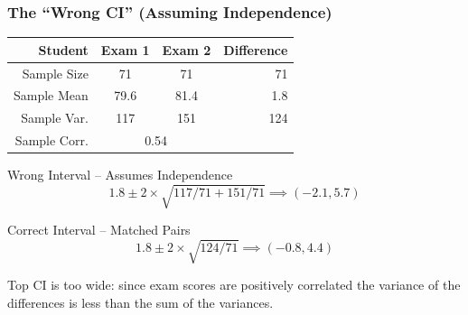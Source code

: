 \begin{frame}
\frametitle{The ``Wrong CI'' (Assuming Independence)}
\footnotesize
%
\begin{table}[!tbp]
\begin{center}
\begin{tabular}{rccr}
\hline\hline
\multicolumn{1}{r}{Student}&\multicolumn{1}{c}{Exam 1}&\multicolumn{1}{c}{Exam 2}&\multicolumn{1}{r}{Difference}\tabularnewline
\hline
Sample Size & 71 & 71 & 71\\
Sample Mean & 79.6 & 81.4  &1.8\\
Sample Var. &117  & 151 & 124\\
Sample Corr.& \multicolumn{2}{c}{0.54}&\\
\hline
\end{tabular}
\end{center}
\end{table}

\singlespacing
\small

\begin{block}{Wrong Interval -- Assumes Independence}
$$1.8 \pm 2\times  \sqrt{117/71 + 151/71} \implies (-2.1, 5.7)$$
\end{block}

\pause

\begin{block}{Correct Interval -- Matched Pairs}
$$1.8 \pm 2\times  \sqrt{124/71} \implies (-0.8, 4.4)$$
\end{block}

\pause
\alert{Top CI is too wide: since exam scores are positively correlated the variance of the differences is less than the sum of the variances.} 

\end{frame}


